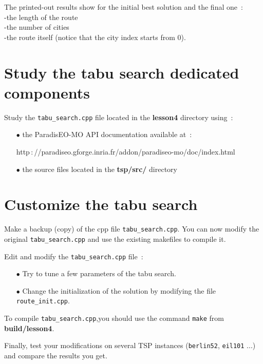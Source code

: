 \documentclass[a4paper]{article}
\begin{document}
    The printed-out results show for the initial best solution and the final one~:
    \\ \hspace*{0.5cm}-the length of the route
    \\ \hspace*{0.5cm}-the number of cities
    \\ \hspace*{0.5cm}-the route itself (notice that the city index starts from 0).


\section{Study the tabu search dedicated components}

     Study the {\tt tabu\_search.cpp} file located in the {\bf lesson4} directory
    using~:
    \begin{itemize}
       \item[$\bullet$] the ParadisEO-MO API documentation available at~:

       \hspace{1cm}http$\,:$//paradiseo.gforge.inria.fr/addon/paradiseo-mo/doc/index.html
       \item[$\bullet$] the source files located in the {\bf tsp/src/} directory
    \end{itemize}

\section{Customize the tabu search}

   Make a backup (copy) of the cpp file {\tt tabu\_search.cpp}. You can now modify the
   original {\tt tabu\_search.cpp} and use the existing makefiles to compile it.

   Edit and modify the {\tt tabu\_search.cpp} file~:
    \begin{itemize}
       \item[$\bullet$] Try to tune a few parameters of the tabu search.
       \item[$\bullet$] Change the initialization of the solution by
       modifying the file {\tt route\_init.cpp}.
    \end{itemize}

    \smallskip
    To compile {\tt tabu\_search.cpp},you should use the
    command {\tt make} from {\bf build/lesson4}.

    \medskip
    Finally, test your modifications on several TSP instances ({\tt berlin52},
    {\tt eil101} ...) and compare the results you get.
\end{document}
